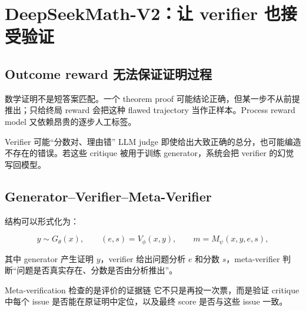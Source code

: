 \documentclass[a4paper]{article}
\begin{document}
\section{DeepSeekMath-V2：让 verifier 也接受验证}

\subsection{Outcome reward 无法保证证明过程}



数学证明不是短答案匹配。一个 theorem proof 可能结论正确，但某一步不从前提推出；只给终局 reward 会把这种 flawed trajectory 当作正样本。Process reward model 又依赖昂贵的逐步人工标签。

\begin{warningbox}{Verifier 可能“分数对、理由错”}
LLM judge 即使给出大致正确的总分，也可能编造不存在的错误。若这些 critique 被用于训练 generator，系统会把 verifier 的幻觉写回模型。
\end{warningbox}

\subsection{Generator--Verifier--Meta-Verifier}


结构可以形式化为：

$$
y\sim G_\theta(x),\qquad
(e,s)=V_\phi(x,y),\qquad
m=M_\psi(x,y,e,s),
$$

其中 generator 产生证明 $y$，verifier 给出问题分析 $e$ 和分数 $s$，meta-verifier 判断“问题是否真实存在、分数是否由分析推出”。


\begin{importantbox}{Meta-verification 检查的是评价的证据链}
它不只是再投一次票，而是验证 critique 中每个 issue 是否能在原证明中定位，以及最终 score 是否与这些 issue 一致。
\end{importantbox}
\end{document}
